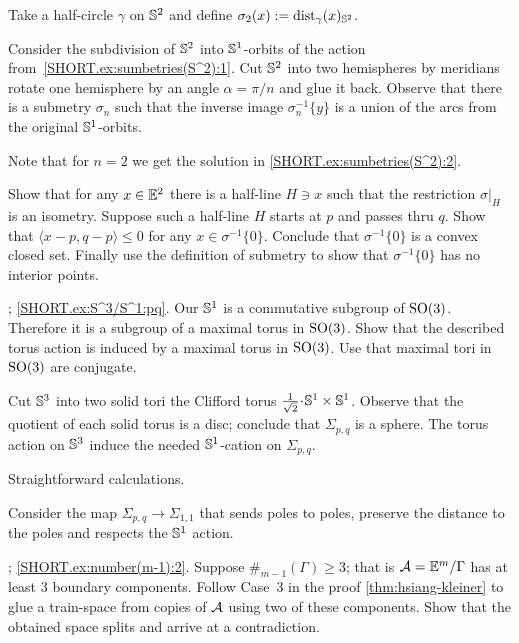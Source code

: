 Take a half-circle $\gamma$ on $\mathbb{S}^2$ and define 
$\sigma_2(x)\mathrel{:=}\mathrm{dist}_\gamma(x)_{\mathbb{S}^2}$.

Consider the subdivision of $\mathbb{S}^2$ into $\mathbb{S}^1$-orbits of the action from~\ref{SHORT.ex:sumbetries(S^2):1}.
Cut $\mathbb{S}^2$ into two hemispheres by meridians rotate one hemisphere by an angle $\alpha=\pi/n$ and glue it back.
Observe that there is a submetry $\sigma_n$ such that the inverse image $\sigma_n^{-1}\{y\}$ is a union of the arcs from the original $\mathbb{S}^1$-orbits.

Note that for $n=2$ we get the solution in \ref{SHORT.ex:sumbetries(S^2):2}.

Show that for any $x\in\mathbb{E}^2$ there is a half-line $H\ni x$ such that 
the restriction $\sigma|_H$ is an isometry.
Suppose such a half-line $H$ starts at $p$ and passes thru $q$.
Show that $\langle x-p,q-p \rangle\le 0$ for any $x\in \sigma^{-1}\{0\}$.
Conclude that $\sigma^{-1}\{0\}$ is a convex closed set.
Finally use the definition of submetry to show that  $\sigma^{-1}\{0\}$ has no interior points. 

\parbf{\ref{ex:S^3/S^1}};
\ref{SHORT.ex:S^3/S^1:pq}.
Our $\mathbb{S}^1$ is a commutative subgroup of $\mathrm{SO}(3)$.
Therefore it is a subgroup of a maximal torus in $\mathrm{SO}(3)$.
Show that the described torus action is induced by a maximal torus in $\mathrm{SO}(3)$.
Use that maximal tori in $\mathrm{SO}(3)$ are conjugate.

Cut $\mathbb{S}^3$ into two solid tori the Clifford torus $\tfrac1{\sqrt2}\cdot \SSS^1\times \SSS^1$.
Observe that the quotient of each solid torus is a disc;
conclude that $\Sigma_{p,q}$ is a sphere.
The torus action on $\mathbb{S}^3$ induce the needed $\mathbb{S}^1$-cation on $\Sigma_{p,q}$.

 Straightforward calculations.

Consider the map $\Sigma_{p,q}\to\Sigma_{1,1}$ that sends poles to poles,
preserve the distance to the poles and respects the $\mathbb{S}^1$ action.

\parbf{\ref{ex:number(m-1)}};
\ref{SHORT.ex:number(m-1):2}.
Suppose $\#_{m-1}(\Gamma)\ge 3$;
that is $\mathcal{A}=\mathbb{E}^m/\Gamma$ has at least 3 boundary components.
Follow Case~3 in the proof \ref{thm:hsiang-kleiner} to glue a train-space from copies of $\mathcal{A}$ using two of these components.
Show that the obtained space splits and arrive at a contradiction.

